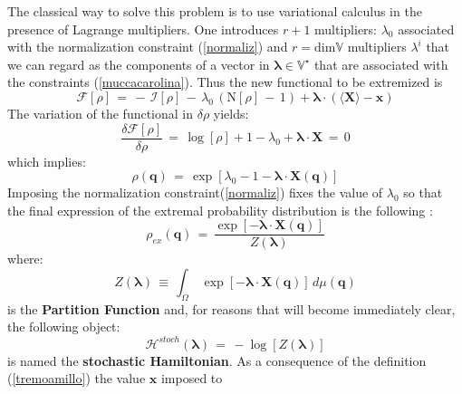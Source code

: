 \documentclass[10pt,a4paper]{article}
\begin{document}
The classical way to solve this problem is to use variational calculus in the presence of Lagrange multipliers. One
introduces $r+1$ multipliers: $\lambda_0$ associated with the
normalization constraint (\ref{normaliz}) and $r=\text{dim} \mathbb{V}$
multipliers $\lambda^i$ that we can regard as the components
of a vector in $\pmb{\lambda}\in\mathbb{V}^\star$ that are associated with
the constraints (\ref{muccacarolina}). Thus the new functional to be extremized is
\begin{equation}\label{functlag}
    \mathcal{F}[\rho]\, = \, -\,\mathcal{I}\left[\rho\right] \, - \,
    \lambda_0 \, \left(\mathrm{N}[\rho] \, -\, 1 \right) +
    \pmb{\lambda}\cdot\left(\langle \mathbf{X}\rangle -\mathbf{x}
    \right)
\end{equation}
The variation of the functional   in $\delta\rho$  yields:
\begin{equation}\label{ralloppo}
    \frac{\delta\mathcal{F}[\rho]}{\delta\rho} \, = \,\log[\rho] +1
    -\lambda_0 +\pmb{\lambda}\cdot\mathbf{X} \, = \,0
\end{equation}
which implies:
\begin{equation}\label{calindro}
    \rho(\mathbf{q}) \, = \,\exp\left[\lambda_0 - 1-
    \pmb{\lambda}\cdot \mathbf{X}(\mathbf{q})\right]
\end{equation}
Imposing the normalization constraint(\ref{normaliz}) fixes the value of
$\lambda_0$  so that the  final expression of the extremal probability distribution is the following :
\begin{equation}\label{distribuzionepesci}
    \rho_{ex}(\mathbf{q}) \, = \,
    \frac{\exp\left[-\pmb{\lambda}\cdot\mathbf{X}\left(\mathbf{q}
    \right)\right]}{Z\left(\pmb{\lambda}\right)}
\end{equation}
where:
\begin{equation}\label{partifungo}
    Z\left(\pmb{\lambda}\right)\, \equiv \, \int_{\Omega}
    \,\exp\left[-\pmb{\lambda}\cdot\mathbf{X}\left(\mathbf{q}\right)
    \right]
    \,d\mu(\mathbf{q})
\end{equation}
is the \textbf{Partition Function} and, for reasons that will become immediately clear,
the following object:
\begin{equation}\label{tremoamillo}
    \mathcal{H}^{stoch}\left(\pmb{\lambda}\right) \, = \, - \log
    \left[Z\left(\pmb{\lambda}\right)\right]
\end{equation}
is named the \textbf{stochastic Hamiltonian}.
As a consequence of the
definition (\ref{tremoamillo}) the value  $\mathbf{x}$ imposed to
\end{document}
